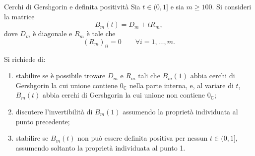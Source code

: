 \documentclass[a4paper]{article}
\begin{document}
\begin{snippetexercise}{Cerchi di Gershgorin e definita positività}
    Sia \(t\in(0,1]\) e sia \(m\geq 100\). Si consideri la matrice
    \[
        B_m(t)=D_m+tR_m,
    \]
    dove \(D_m\) è diagonale e \(R_m\) è tale che
    \[
        (R_m)_{ii}=0
        \qquad
        \forall i=1,\dots,m.
    \]

    Si richiede di:
    \begin{enumerate}
        \item stabilire se è possibile trovare \(D_m\) e \(R_m\) tali che \(B_m(1)\) abbia cerchi di Gershgorin la cui unione contiene \(0_{\mathbb C}\) nella parte interna, e, al variare di \(t\), \(B_m(t)\) abbia cerchi di Gershgorin la cui unione non contiene \(0_{\mathbb C}\);
        \item discutere l'invertibilità di \(B_m(1)\) assumendo la proprietà individuata al punto precedente;
        \item stabilire se \(B_m(t)\) non può essere definita positiva per nessun \(t\in(0,1]\), assumendo soltanto la proprietà individuata al punto 1.
    \end{enumerate}
\end{snippetexercise}
\end{document}

